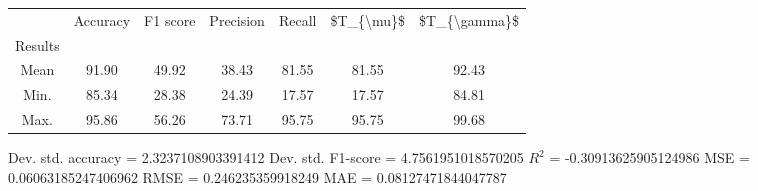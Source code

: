 \begin{tabular}{|c|c|c|c|c|c|c|}
\toprule
{} &  Accuracy &  F1 score &  Precision &  Recall &  \$T\_\{\textbackslash mu\}\$ &  \$T\_\{\textbackslash gamma\}\$ \\
Results &           &           &            &         &            &               \\
\hline
Mean    &     91.90 &     49.92 &      38.43 &   81.55 &      81.55 &         92.43 \\
Min.    &     85.34 &     28.38 &      24.39 &   17.57 &      17.57 &         84.81 \\
Max.    &     95.86 &     56.26 &      73.71 &   95.75 &      95.75 &         99.68 \\
\bottomrule
\end{tabular}

 Dev. std. accuracy = 2.3237108903391412
 Dev. std. F1-score = 4.7561951018570205
 $R^2$ = -0.30913625905124986
 MSE = 0.06063185247406962
 RMSE = 0.246235359918249
 MAE = 0.08127471844047787